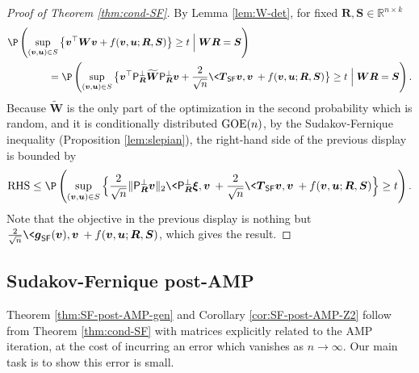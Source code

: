 \documentclass[]{article}
\def\bR{{\boldsymbol R}}
\def\bW{{\boldsymbol W}}
\def\bv{{\boldsymbol V}}
\def\bT{\boldsymbol{T}}
\def\bS{\boldsymbol{S}}
\def\proj{{\mathsf P}}
\def\bu{{\boldsymbol u}}
\def\bg{{\boldsymbol g}}
\def\bv{{\boldsymbol v}}
\def\bxi{{\boldsymbol \xi}}
\def\reals{{\mathbb R}}
\def\bW{{\boldsymbol W}}
\def\bv{{\boldsymbol v}}
\def\proj{{\mathsf P}}
\def\bu{{\boldsymbol u}}
\def\bg{{\boldsymbol g}}
\def\GOE{{\rm GOE}}
\def\bWtilde{\widetilde{\boldsymbol{W}}{}}
\def\SF{\mathsf{SF}}
\def\bWtilde{\widetilde{\boldsymbol{W}}{}}
\begin{document}
\begin{proof}[Proof of Theorem \ref{thm:cond-SF}]
    By Lemma \ref{lem:W-det}, 
    for fixed $\bR,\bS \in \reals^{n \times k}$
    \begin{equation}
    \begin{aligned}
        &\P\left(
            \sup_{(\bv,\bu) \in S} \big\{ \bv^\top \bW \bv + f(\bv,\bu; \bR,\bS) \big\} \geq t 
            \Bigm|
            \bW \bR = \bS 
        \right)
        \\
        &\qquad\qquad =
        \P\left(
            \sup_{(\bv,\bu) \in S} \big\{ \bv^\top \proj_{\bR}^\perp \bWtilde \proj_{\bR}^\perp \bv + \frac{2}{\sqrt{n}} \< \bT_{\SF} \bv, \bv \> + f(\bv,\bu; \bR,\bS) \big\} \geq t 
            \Bigm|
            \bW \bR = \bS 
        \right).
    \end{aligned}
    \end{equation}
    Because $\bWtilde$ is the only part of the optimization in the second probability which is random,
    and it is conditionally distributed $\GOE(n)$, 
    by the Sudakov-Fernique inequality (Proposition \ref{lem:slepian}),
    the right-hand side of the previous display is bounded by
    \begin{equation}
        \mathrm{RHS}
            \leq 
            \P\left(
            \sup_{(\bv,\bu) \in S} \Big\{ \frac{2}{\sqrt{n}}\| \proj_{\bR}^\perp \bv \|_2 \< \proj_{\bR}^\perp \bxi ,  \bv\>  + \frac{2}{\sqrt{n}} \<\bT_{\SF} \bv,  \bv \> + f(\bv,\bu; \bR,\bS) \Big\} \geq t
        \right).
    \end{equation}
    Note that the objective in the previous display is nothing but $\frac2{\sqrt{n}}\< \bg_{\SF}(\bv),\bv\> + f(\bv,\bu;\bR,\bS)$,
    which gives the result.
\end{proof}

\subsection{Sudakov-Fernique post-AMP}
\label{sec:proof-of-SF-post-AMP}

Theorem \ref{thm:SF-post-AMP-gen} and Corollary \ref{cor:SF-post-AMP-Z2} follow from Theorem \ref{thm:cond-SF} 
with matrices explicitly related to the AMP iteration,
at the cost of incurring an error which vanishes as $n \rightarrow \infty$.
Our main task is to show this error is small.
\end{document}
